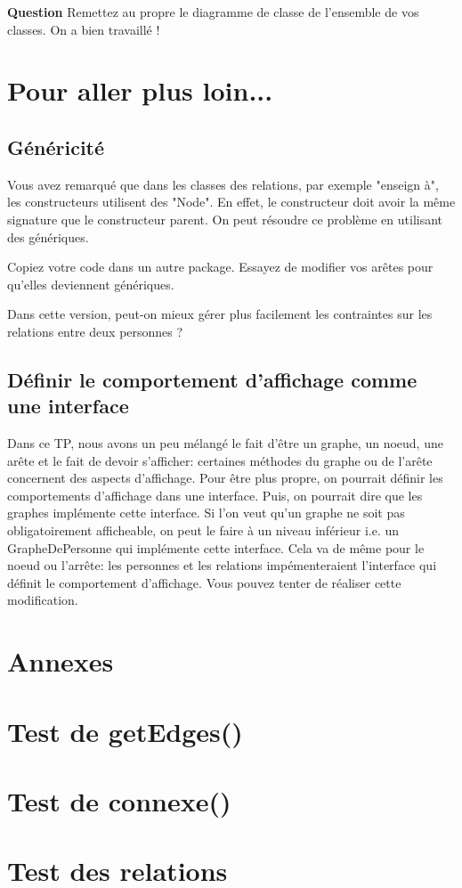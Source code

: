 \documentclass[11pt,TP,2A]{tdtp}
\newcounter{numeroexoq}
\newcommand{\question}{\par\noindent\stepcounter{numeroexoq}
\hspace{-.25cm}\colorbox{normal}{\textbf{Question \arabic{numeroexoq}}}\quad}
\begin{document}
\question Remettez au propre le diagramme de classe de l'ensemble de vos classes. On a bien travaillé !

\newpage

\section{Pour aller plus loin...}

\subsection{Généricité}

Vous avez remarqué que dans les classes des relations, par exemple "enseign à", les constructeurs utilisent des "Node". En effet, le constructeur doit avoir la même signature que le constructeur parent. On peut résoudre ce problème en utilisant des génériques.

\quest Copiez votre code dans un autre package. Essayez de modifier vos arêtes pour qu'elles deviennent génériques.

\quest Dans cette version, peut-on mieux gérer plus facilement les contraintes sur les relations entre deux personnes ?

\subsection{Définir le comportement d'affichage comme une interface}

\quest Dans ce TP, nous avons un peu mélangé le fait d'être un graphe, un noeud, une arête et le fait de devoir s'afficher: certaines méthodes du graphe ou de l'arête concernent des aspects d'affichage. Pour être plus propre, on pourrait définir les comportements d'affichage dans une interface. Puis, on pourrait dire que les graphes implémente cette interface. Si l'on veut qu'un graphe ne soit pas obligatoirement afficheable, on peut le faire à un niveau inférieur i.e. un GrapheDePersonne qui implémente cette interface. Cela va de même pour le noeud ou l'arrête: les personnes et les relations impémenteraient l'interface qui définit le comportement d'affichage. Vous pouvez tenter de réaliser cette modification.

\appendix

\section*{Annexes}

\section{Test de getEdges()}
\label{getEdges}



\section{Test de connexe()}
\label{connexe}



\section{Test des relations}
\label{relation}


\end{document}
